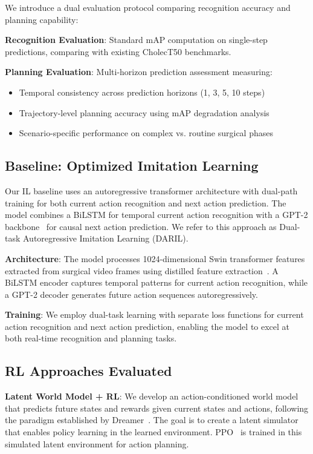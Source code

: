 \documentclass[runningheads]{llncs}
\begin{document}
We introduce a dual evaluation protocol comparing recognition accuracy and planning capability:

\textbf{Recognition Evaluation}: Standard mAP computation on single-step predictions, comparing with existing CholecT50 benchmarks.

\textbf{Planning Evaluation}: Multi-horizon prediction assessment measuring:
\begin{itemize}
\item Temporal consistency across prediction horizons (1, 3, 5, 10 steps)
\item Trajectory-level planning accuracy using mAP degradation analysis
\item Scenario-specific performance on complex vs. routine surgical phases
\end{itemize}


\subsection{Baseline: Optimized Imitation Learning}

Our IL baseline uses an autoregressive transformer architecture with dual-path training for both current action recognition and next action prediction. The model combines a BiLSTM for temporal current action recognition with a GPT-2 backbone~\cite{radford2019language} for causal next action prediction. We refer to this approach as Dual-task Autoregressive Imitation Learning (DARIL).

\textbf{Architecture}: The model processes 1024-dimensional Swin transformer features~\cite{liu2021swin} extracted from surgical video frames using distilled feature extraction~\cite{yamlahi2023self}. A BiLSTM encoder captures temporal patterns for current action recognition, while a GPT-2 decoder generates future action sequences autoregressively.

\textbf{Training}: We employ dual-task learning with separate loss functions for current action recognition and next action prediction, enabling the model to excel at both real-time recognition and planning tasks.

\subsection{RL Approaches Evaluated}

\textbf{Latent World Model + RL}: We develop an action-conditioned world model that predicts future states and rewards given current states and actions, following the paradigm established by Dreamer~\cite{hafner2020dream}. The goal is to create a latent simulator that enables policy learning in the learned environment. PPO~\cite{schulman2017proximal} is trained in this simulated latent environment for action planning.
\end{document}
